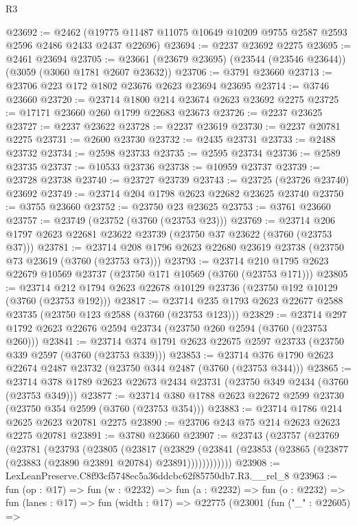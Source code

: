 \begin{lexlean}{R3}
\begin{coremodule}
@23692 := @2462
    (@19775 @11487 @11075 @10649 @10209 @9755 @2587 @2593 @2596 @2486 @2433 @2437 @22696)
@23694 := @2237 @23692 @2275
@23695 := @2461 @23694
@23705 := @23661 (@23679 @23695) (@23544 (@23546 @23644)) (@3059 (@3060 @1781 @2607 @23632))
@23706 := @3791 @23660
@23713 := @23706 @223 @172 @1802 @23676 @2623 @23694 @23695
@23714 := @3746 @23660
@23720 := @23714 @1800 @214 @23674 @2623 @23692 @2275
@23725 := @17171 @23660 @260 @1799 @22683 @23673
@23726 := @2237 @23625
@23727 := @2237 @23622
@23728 := @2237 @23619
@23730 := @2237 @20781 @2275
@23731 := @2600 @23730
@23732 := @2435 @23731
@23733 := @2488 @23732
@23734 := @2598 @23733
@23735 := @2595 @23734
@23736 := @2589 @23735
@23737 := @10533 @23736
@23738 := @10959 @23737
@23739 := @23728 @23738
@23740 := @23727 @23739
@23743 := @23725 (@23726 @23740) @23692
@23749 := @23714 @204 @1798 @2623 @22682 @23625 @23740
@23750 := @3755 @23660
@23752 := @23750 @23 @23625
@23753 := @3761 @23660
@23757 := @23749 (@23752 (@3760 (@23753 @23)))
@23769 := @23714 @206 @1797 @2623 @22681 @23622 @23739 (@23750 @37 @23622 (@3760 (@23753 @37)))
@23781 := @23714 @208 @1796 @2623 @22680 @23619 @23738 (@23750 @73 @23619 (@3760 (@23753 @73)))
@23793 := @23714 @210 @1795 @2623 @22679 @10569 @23737 (@23750 @171 @10569 (@3760 (@23753 @171)))
@23805 := @23714 @212 @1794 @2623 @22678 @10129 @23736 (@23750 @192 @10129 (@3760 (@23753 @192)))
@23817 := @23714 @235 @1793 @2623 @22677 @2588 @23735 (@23750 @123 @2588 (@3760 (@23753 @123)))
@23829 := @23714 @297 @1792 @2623 @22676 @2594 @23734 (@23750 @260 @2594 (@3760 (@23753 @260)))
@23841 := @23714 @374 @1791 @2623 @22675 @2597 @23733 (@23750 @339 @2597 (@3760 (@23753 @339)))
@23853 := @23714 @376 @1790 @2623 @22674 @2487 @23732 (@23750 @344 @2487 (@3760 (@23753 @344)))
@23865 := @23714 @378 @1789 @2623 @22673 @2434 @23731 (@23750 @349 @2434 (@3760 (@23753 @349)))
@23877 := @23714 @380 @1788 @2623 @22672 @2599 @23730 (@23750 @354 @2599 (@3760 (@23753 @354)))
@23883 := @23714 @1786 @214 @2625 @2623 @20781 @2275
@23890 := @23706 @243 @75 @214 @2623 @2623 @2275 @20781
@23891 := @3780 @23660
@23907 := @23743
    (@23757
      (@23769
        (@23781
          (@23793
            (@23805
              (@23817
                (@23829
                  (@23841 (@23853 (@23865 (@23877 (@23883 (@23890 @23891 @20784) @23891))))))))))))
@23908 := LexLeanPreserve.C8f93cf5748ec5a36ddcbc62f85750db7.R3.__rel_8
@23963 := fun (op : @17) =>
  fun (w : @2232) =>
  fun (a : @2232) =>
  fun (o : @2232) =>
  fun (lanes : @17) =>
  fun (width : @17) =>
  @22775
    (@23001
      (fun ("_" : @22605) =>

\end{coremodule}
\end{lexlean}
